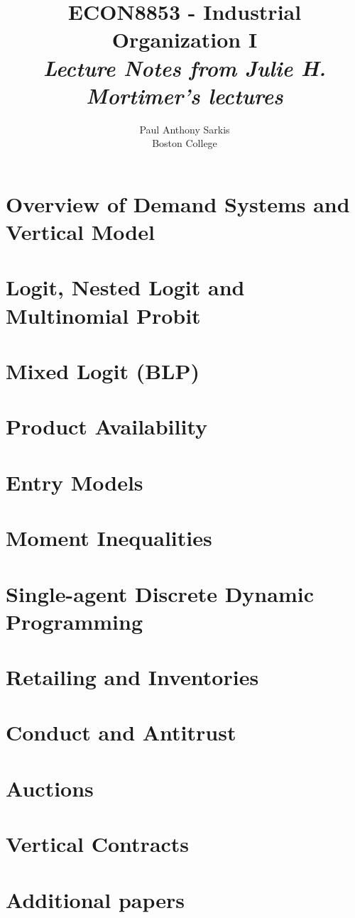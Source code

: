 \documentclass[12pt]{report}
\begin{document}
\date{}
\title{\textbf{\huge{ECON8853 - Industrial Organization I}}\\ \textit{Lecture Notes from Julie H. Mortimer's lectures}}
\author{Paul Anthony Sarkis\\ Boston College} 
 
\maketitle

\tableofcontents


\chapter{Overview of Demand Systems and Vertical Model}


\chapter{Logit, Nested Logit and Multinomial Probit}


\chapter{Mixed Logit (BLP)}


\chapter{Product Availability}


\chapter{Entry Models}


\chapter{Moment Inequalities}


\chapter{Single-agent Discrete Dynamic Programming}


\chapter{Retailing and Inventories}


\chapter{Conduct and Antitrust}


\chapter{Auctions}


\chapter{Vertical Contracts}


\chapter{Additional papers}

\end{document}
